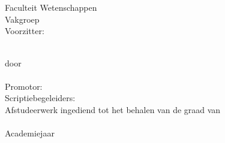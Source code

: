 \begin{titlepage}
\renewcommand{\baselinestretch}{1.1}
\Large
\begin{center}
\mbox{}\\[0cm]%
\unitlength 1mm

\epsfysize 4cm \epsfclipon{}\\
{\Large  
Faculteit Wetenschappen\\
Vakgroep \vakgroep\\
Voorzitter: \voorzitter
}\\\vfill
\parbox{14 cm}{
{\Huge\bfseries
\begin{center}
\sf\titel
\end{center}
}
}\\\vfill
door\\ 
{\LARGE \auteur}\\[3.3cm]
Promotor: \promotor \\
Scriptiebegeleiders: \begeleider 
\\\vfill
Afstudeerwerk ingediend tot het behalen van de graad van\\
\richting\\[1cm]
Academiejaar \jaar
\end{center}
\renewcommand{\baselinestretch}{1}
\end{titlepage}





